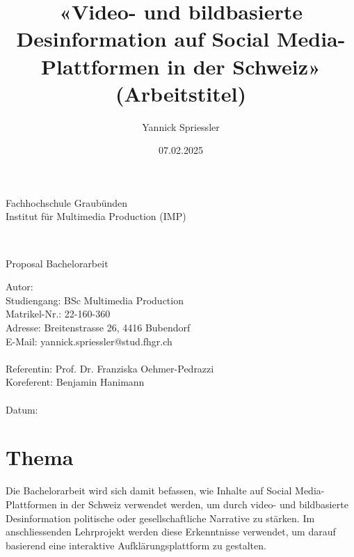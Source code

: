 \documentclass[12pt,a4paper]{article}        %
\title{«Video- und bildbasierte Desinformation auf Social Media-Plattformen in der Schweiz» (Arbeitstitel)}        %
\author{Yannick Spriessler}     %
\date{07.02.2025}     %
\begin{document}
\begin{titlingpage} %
  \begin{center}
    \begin{large}
      Fachhochschule Graubünden\\ Institut für Multimedia Production (IMP)\\ %
    \end{large}
    \vspace{2cm} %
    \begin{LARGE}
      \textbf{\thetitle} \\
    \end{LARGE}
    \vspace{1cm}
    \begin{large}
      Proposal Bachelorarbeit\\
    \end{large}
    \vspace{5cm} %
    Autor: \theauthor \\
    Studiengang: BSc Multimedia Production \\
    Matrikel-Nr.: 22-160-360 \\
    Adresse: Breitenstrasse 26, 4416 Bubendorf \\
    E-Mail: yannick.spriessler@stud.fhgr.ch \\ \\
    Referentin: Prof. Dr. Franziska Oehmer-Pedrazzi \\
    Koreferent: Benjamin Hanimann \\ \\
    Datum: \thedate
  \end{center}
\end{titlingpage}
\thispagestyle{empty}
\setcounter{page}{0}    %
\tableofcontents        %
\pagebreak

\section{Thema}
Die Bachelorarbeit wird sich damit befassen, wie Inhalte auf Social Media-Plattformen in der Schweiz verwendet werden, um durch video- und bildbasierte Desinformation politische oder gesellschaftliche Narrative zu stärken. Im anschliessenden Lehrprojekt werden diese Erkenntnisse verwendet, um darauf basierend eine interaktive Aufklärungsplattform zu gestalten.
\end{document}
